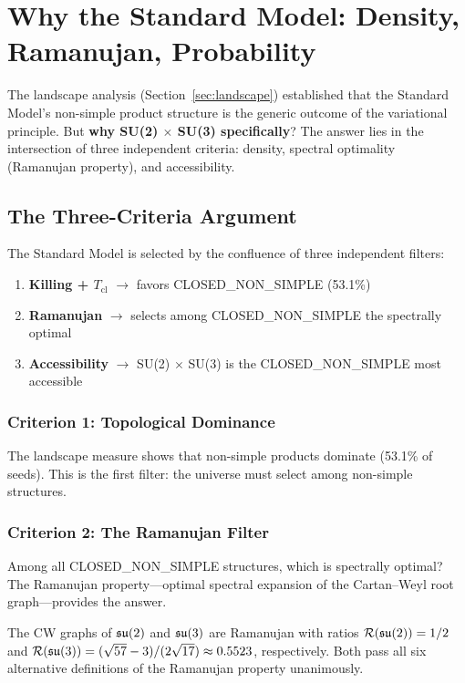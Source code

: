 \section{Why the Standard Model: Density, Ramanujan, Probability}\label{sec:why_sm}

The landscape analysis (Section~\ref{sec:landscape}) established that the Standard Model's non-simple product structure is the generic outcome of the variational principle. But \textbf{why SU(2) $\times$ SU(3) specifically}? The answer lies in the intersection of three independent criteria: density, spectral optimality (Ramanujan property), and accessibility.

\subsection{The Three-Criteria Argument}\label{sec:three_criteria}

The Standard Model is selected by the confluence of three independent filters:

\begin{enumerate}
\item \textbf{Killing + $T_{\mathrm{cl}}$} $\to$ favors CLOSED\_NON\_SIMPLE (53.1\%)
\item \textbf{Ramanujan} $\to$ selects among CLOSED\_NON\_SIMPLE the spectrally optimal
\item \textbf{Accessibility} $\to$ SU(2) $\times$ SU(3) is the CLOSED\_NON\_SIMPLE most accessible
\end{enumerate}

\subsubsection{Criterion 1: Topological Dominance}

The landscape measure shows that non-simple products dominate (53.1\% of seeds). This is the first filter: the universe must select among non-simple structures.

\subsubsection{Criterion 2: The Ramanujan Filter}

Among all CLOSED\_NON\_SIMPLE structures, which is spectrally optimal? The Ramanujan property---optimal spectral expansion of the Cartan--Weyl root graph---provides the answer.

\begin{theorem}
The CW graphs of $\mathfrak{su}(2)$ and $\mathfrak{su}(3)$ are Ramanujan with ratios $\mathcal{R}(\mathfrak{su}(2)) = 1/2$ and $\mathcal{R}(\mathfrak{su}(3)) = (\sqrt{57} - 3)/(2\sqrt{17}) \approx 0.5523$, respectively. Both pass all six alternative definitions of the Ramanujan property unanimously.
\end{theorem}

